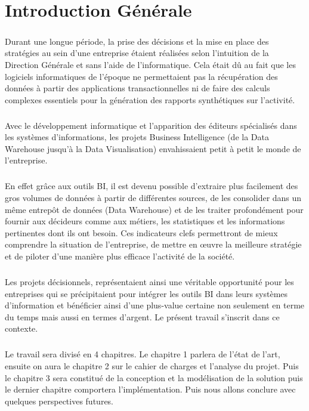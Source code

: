 \chapter*{Introduction Générale}%
%
\paragraph{}
Durant une longue période, la prise des décisions et la mise en place des stratégies au sein d’une entreprise étaient réalisées selon l’intuition de la Direction Générale et sans l’aide de l’informatique. Cela était dû au fait que les logiciels informatiques de l’époque ne permettaient pas la récupération des données à partir des applications transactionnelles ni de faire des calculs complexes essentiels pour la génération des rapports synthétiques sur l’activité.
\paragraph{}
Avec le développement informatique et l’apparition des éditeurs spécialisés dans les systèmes d’informations, les projets Business Intelligence (de la Data Warehouse jusqu’à la Data Visualisation) envahissaient petit à petit le monde de l’entreprise.
\paragraph{}
En effet grâce aux outils BI, il est devenu possible d’extraire plus facilement des gros volumes de données à partir de différentes sources, de les consolider dans un même entrepôt de données (Data Warehouse) et de les traiter profondément pour fournir aux décideurs comme aux métiers, les statistiques et les informations pertinentes dont ils ont besoin. Ces indicateurs clefs permettront de mieux comprendre la situation de l’entreprise, de mettre en œuvre la meilleure stratégie et de piloter d’une manière plus efficace l’activité de la société.
\paragraph{}
Les projets décisionnels, représentaient ainsi une véritable opportunité pour les entreprises qui se précipitaient pour intégrer les outils BI dans leurs systèmes d’information et bénéficier ainsi d’une plus-value certaine non seulement en terme du temps mais aussi en termes d’argent. Le présent travail s’inscrit dans ce contexte. 
\paragraph{}
Le travail sera divisé en 4 chapitres. Le chapitre 1 parlera de l’état de l’art, ensuite on aura le chapitre 2 sur le cahier de charges et l'analyse du projet. Puis le chapitre 3 sera constitué de la conception et la modélisation de la solution puis le dernier chapitre comportera l'implémentation. Puis nous allons conclure avec quelques perspectives futures.
